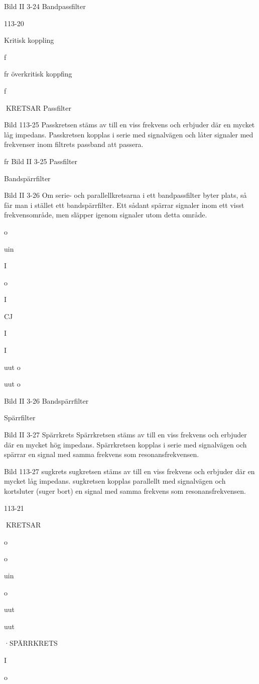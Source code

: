 {{{Bild II 3-24 Bandpassfilter

113-20

Kritisk koppling

f

fr
överkritisk koppfing

f

KRETSAR
Passfilter

Bild 113-25
Passkretsen stäms av till en viss frekvens
och erbjuder där en mycket låg impedans.
Passkretsen kopplas i serie med signalvägen och låter signaler med frekvenser inom
filtrets passband att passera.

fr
Bild II 3-25 Passfilter

Bandspärrfilter

Bild II 3-26
Om serie- och parallellkretsarna i ett bandpassfilter byter plats, så får man i stället ett
bandspärrfilter. Ett sådant spärrar signaler
inom ett visst frekvensområde, men släpper
igenom signaler utom detta område.

o

uin

I

o

I

CJ

I

I

uut
o

uut
o

Bild II 3-26 Bandspärrfilter

Spärrfilter

Bild II 3-27
Spärrkrets
Spärrkretsen stäms av till en viss frekvens
och erbjuder där en mycket hög impedans.
Spärrkretsen kopplas i serie med signalvägen och spärrar en signal med samma
frekvens som resonansfrekvensen.

Bild 113-27
sugkrets
sugkretsen stäms av till en viss frekvens och
erbjuder där en mycket låg impedans. sugkretsen kopplas parallellt med signalvägen
och kortsluter (suger bort) en signal med
samma frekvens som resonansfrekvensen.

113-21

KRETSAR

o

o

uin

o

uut

uut

·SPÄRRKRETS

I

o

}}}
